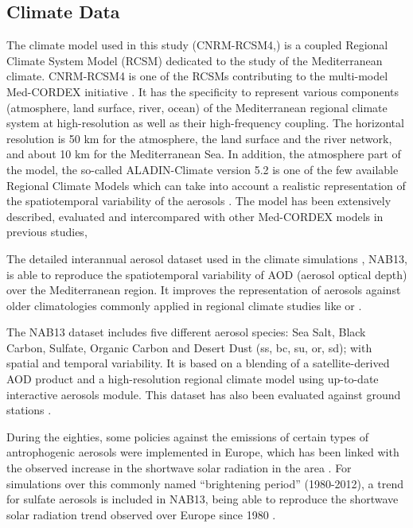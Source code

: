 \subsection{Climate Data}

The climate model used in this study (CNRM-RCSM4,\cite*{Sevault2014}) is a coupled Regional Climate System Model (RCSM) dedicated to the study of the Mediterranean climate. CNRM-RCSM4 is one of the RCSMs contributing to the multi-model Med-CORDEX initiative \cite*{Ruti2016}. It has the specificity to represent various components (atmosphere, land surface, river, ocean) of the Mediterranean regional climate system at high-resolution as well as their high-frequency coupling. The horizontal resolution is 50 km for the atmosphere, the land surface and the river network, and about 10 km for the Mediterranean Sea. In addition, the atmosphere part of the model, the so-called ALADIN-Climate version 5.2 \cite*{Colin2010} is one of the few available Regional Climate Models which can take into account a realistic representation of the spatiotemporal variability of the aerosols \cite*{Nabat2014}. The model has been extensively described, evaluated and intercompared with other Med-CORDEX models in previous studies, \cite{Sevault2014, Nabat2014, Nabat2014a,Flaounas2016, Gaertner2016, DellAquila2016, Harzallah2016, Cavicchia2016}

The detailed interannual aerosol dataset used in the climate simulations \cite*{Nabat2013}, NAB13, is able to reproduce the spatiotemporal variability of AOD (aerosol optical depth) over the Mediterranean region. It improves the representation of aerosols against older climatologies commonly applied in regional climate studies like \cite{Tegen1997} or \cite{tanre1984first}.

The NAB13 dataset includes five different aerosol species: Sea Salt, Black Carbon, Sulfate, Organic Carbon and Desert Dust (ss, bc, su, or, sd); with spatial and temporal variability. It is based on a blending of a satellite-derived AOD product and a high-resolution regional climate model using up-to-date interactive aerosols module. This dataset has also been evaluated against ground stations \cite*{Nabat2013}.

During the eighties, some policies against the emissions of certain types of antrophogenic aerosols were implemented in Europe, which has been linked with the observed increase in the shortwave solar radiation in the area \cite*{Wild2005}. For simulations over this commonly named ``brightening period'' (1980-2012), a trend for sulfate aerosols is included in NAB13, being able to reproduce the shortwave solar radiation trend observed over Europe since 1980 \cite*{Nabat2014a}.

